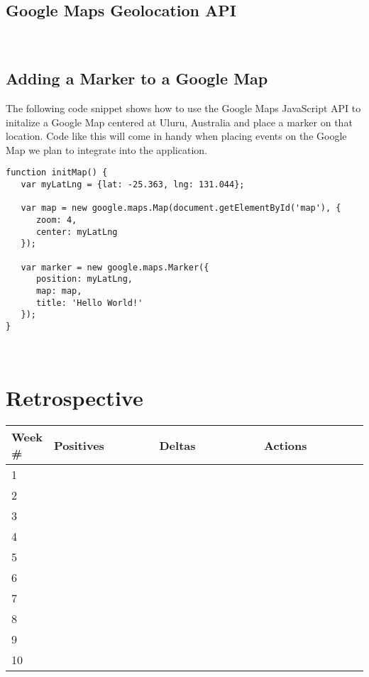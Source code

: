 \documentclass[draftclsnofoot, onecolumn, 10pt, compsoc]{IEEEtran}
\begin{document}
      \subsection{Google Maps Geolocation API}
      ~\cite{GMaps_Geo}
      \subsection{Adding a Marker to a Google Map}
      The following code snippet shows how to use the Google Maps JavaScript API to initalize a Google Map centered at Uluru, Australia and place a marker on that location. Code like this will come in handy when placing events on the Google Map we plan to integrate into the application.
      \begin{lstlisting}[style=c++]
function initMap() {
   var myLatLng = {lat: -25.363, lng: 131.044};

   var map = new google.maps.Map(document.getElementById('map'), {
      zoom: 4,
      center: myLatLng
   });

   var marker = new google.maps.Marker({
      position: myLatLng,
      map: map,
      title: 'Hello World!'
   });
}
      \end{lstlisting}
      ~\cite{GMaps_Marker}
   \section{Retrospective}
      \begin{tabular}{|p{0.1\linewidth}|p{0.3\linewidth}|p{0.3\linewidth}|p{0.3\linewidth}|}
         \hline
         Week \# & Positives & Deltas & Actions \\ \hline
         1 & & & \\ \hline
         2 & & & \\ \hline
         3 & & & \\ \hline
         4 & & & \\ \hline
         5 & & & \\ \hline
         6 & & & \\ \hline
         7 & & & \\ \hline
         8 & & & \\ \hline
         9 & & & \\ \hline
         10 & & & \\ \hline
      \end{tabular}

   
   
\end{document}
